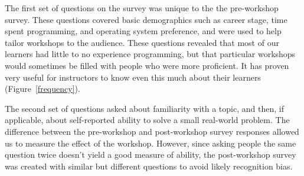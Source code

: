 \documentclass[10pt, twocolumn]{article}
\begin{document}
The first set of questions on the survey was unique to the the pre-workshop survey.
These questions covered basic demographics such as career stage,
time spent programming,
and operating system preference,
and were used to help tailor workshops to the audience.
These questions revealed that most of our learners had little to no experience programming,
but that particular workshops would sometimes be filled with people who were more proficient.
It has proven very useful for instructors to know even this much about their learners (Figure~\ref{frequency}).



The second set of questions asked about familiarity with a topic,
and then,
if applicable,
about self-reported ability to solve a small real-world problem.
The difference between the pre-workshop and post-workshop survey responses allowed us to measure the effect of the workshop.
However,
since asking people the same question twice doesn't yield a good measure of ability,
the post-workshop survey was created with similar but different questions
to avoid likely recognition bias.
\end{document}
